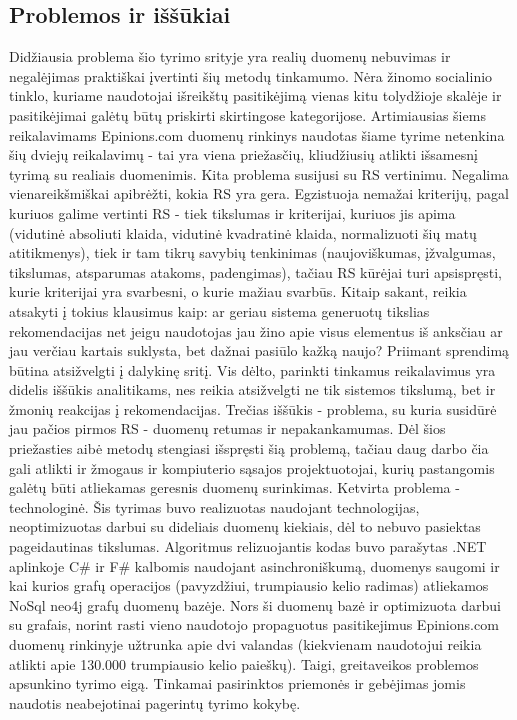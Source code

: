 \documentclass{VUMIFInfMagistrinis}
\begin{document}

\subsection{Problemos ir iššūkiai}
\indent
Didžiausia problema šio tyrimo srityje yra realių duomenų nebuvimas ir negalėjimas praktiškai įvertinti šių metodų tinkamumo. Nėra žinomo socialinio tinklo, kuriame naudotojai išreikštų pasitikėjimą vienas kitu tolydžioje skalėje ir pasitikėjimai galėtų būtų priskirti skirtingose kategorijose. Artimiausias šiems reikalavimams Epinions.com duomenų rinkinys naudotas šiame tyrime netenkina šių dviejų reikalavimų - tai yra viena priežasčių, kliudžiusių atlikti išsamesnį tyrimą su realiais duomenimis. 
\newline
\indent
Kita problema susijusi su RS vertinimu. Negalima vienareikšmiškai apibrėžti, kokia RS yra gera. Egzistuoja nemažai kriterijų, pagal kuriuos galime vertinti RS - tiek tikslumas ir kriterijai, kuriuos jis apima (vidutinė absoliuti klaida, vidutinė kvadratinė klaida, normalizuoti šių matų atitikmenys), tiek ir tam tikrų savybių tenkinimas (naujoviškumas, įžvalgumas, tikslumas, atsparumas atakoms, padengimas), tačiau RS kūrėjai turi apsispręsti, kurie kriterijai yra svarbesni, o kurie mažiau svarbūs. Kitaip sakant, reikia atsakyti į tokius klausimus kaip: ar geriau sistema generuotų tikslias rekomendacijas net jeigu naudotojas jau žino apie visus elementus iš anksčiau ar jau verčiau kartais suklysta, bet dažnai pasiūlo kažką naujo? Priimant sprendimą būtina atsižvelgti į dalykinę sritį. Vis dėlto, parinkti tinkamus reikalavimus yra didelis iššūkis analitikams, nes reikia atsižvelgti ne tik sistemos tikslumą, bet ir žmonių reakcijas į rekomendacijas.
\newline
\indent
Trečias iššūkis - problema, su kuria susidūrė jau pačios pirmos RS - duomenų retumas ir nepakankamumas. Dėl šios priežasties aibė metodų stengiasi išspręsti šią problemą, tačiau daug darbo čia gali atlikti ir žmogaus ir kompiuterio sąsajos projektuotojai, kurių pastangomis galėtų būti atliekamas geresnis duomenų surinkimas. 
\newline
\indent
Ketvirta problema - technologinė. Šis tyrimas buvo realizuotas naudojant technologijas, neoptimizuotas darbui su dideliais duomenų kiekiais, dėl to nebuvo pasiektas pageidautinas tikslumas. Algoritmus relizuojantis kodas buvo parašytas .NET aplinkoje C\# ir F\# kalbomis naudojant asinchroniškumą, duomenys saugomi ir kai kurios grafų operacijos (pavyzdžiui, trumpiausio kelio radimas) atliekamos NoSql neo4j grafų duomenų bazėje. Nors ši duomenų bazė ir optimizuota darbui su grafais, norint rasti vieno naudotojo propaguotus pasitikejimus Epinions.com duomenų rinkinyje užtrunka apie dvi valandas (kiekvienam naudotojui reikia atlikti apie 130.000 trumpiausio kelio paieškų). Taigi, greitaveikos problemos  apsunkino tyrimo eigą. Tinkamai pasirinktos priemonės ir gebėjimas jomis naudotis neabejotinai pagerintų tyrimo kokybę.
\end{document}
